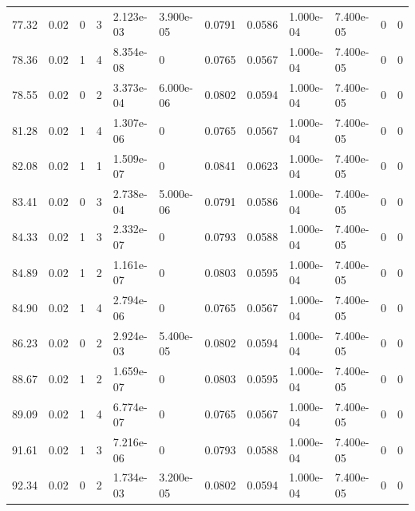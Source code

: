 \documentclass[preview]{standalone}
\begin{document}
{{{\begin{tabular}{L{1.2cm}C{1.2cm} C{0.3cm}C{0.5cm} C{1.4cm}C{1.4cm} C{1.4cm}C{1.4cm} C{1.6cm}C{1.6cm} C{1.6cm}C{1.6cm}}
  77.32  &  0.02  & 0     &  3 &  2.123e-03  & 3.900e-05  &  0.0791&   0.0586& 1.000e-04 & 7.400e-05   &  0 & 0  \\ 
  78.36  &  0.02  & 1     &  4 &  8.354e-08  & 0  &  0.0765&   0.0567& 1.000e-04 & 7.400e-05   &  0 & 0  \\ 
  78.55  &  0.02  & 0     &  2 &  3.373e-04  & 6.000e-06  &  0.0802&   0.0594& 1.000e-04 & 7.400e-05   &  0 & 0  \\ 
  81.28  &  0.02  & 1     &  4 &  1.307e-06  & 0  &  0.0765&   0.0567& 1.000e-04 & 7.400e-05   &  0 & 0  \\ 
  82.08  &  0.02  & 1     &  1 &  1.509e-07  & 0  &  0.0841&   0.0623& 1.000e-04 & 7.400e-05   &  0 & 0  \\ 
  83.41  &  0.02  & 0     &  3 &  2.738e-04  & 5.000e-06  &  0.0791&   0.0586& 1.000e-04 & 7.400e-05   &  0 & 0  \\ 
  84.33  &  0.02  & 1     &  3 &  2.332e-07  & 0  &  0.0793&   0.0588& 1.000e-04 & 7.400e-05   &  0 & 0  \\ 
  84.89  &  0.02  & 1     &  2 &  1.161e-07  & 0  &  0.0803&   0.0595& 1.000e-04 & 7.400e-05   &  0 & 0  \\ 
  84.90  &  0.02  & 1     &  4 &  2.794e-06  & 0  &  0.0765&   0.0567& 1.000e-04 & 7.400e-05   &  0 & 0  \\ 
  86.23  &  0.02  & 0     &  2 &  2.924e-03  & 5.400e-05  &  0.0802&   0.0594& 1.000e-04 & 7.400e-05   &  0 & 0  \\ 
  88.67  &  0.02  & 1     &  2 &  1.659e-07  & 0  &  0.0803&   0.0595& 1.000e-04 & 7.400e-05   &  0 & 0  \\ 
  89.09  &  0.02  & 1     &  4 &  6.774e-07  & 0  &  0.0765&   0.0567& 1.000e-04 & 7.400e-05   &  0 & 0  \\ 
  91.61  &  0.02  & 1     &  3 &  7.216e-06  & 0  &  0.0793&   0.0588& 1.000e-04 & 7.400e-05   &  0 & 0  \\ 
  92.34  &  0.02  & 0     &  2 &  1.734e-03  & 3.200e-05  &  0.0802&   0.0594& 1.000e-04 & 7.400e-05   &  0 & 0  \\ 
\hline 
\end{tabular} 

}}}
\end{document}
